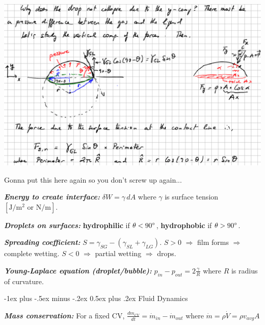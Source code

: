 \documentclass[10pt,landscape,letterpaper]{article}
\makeatletter
\renewcommand{\subsection}{\@startsection{subsection}{2}{0mm}%
                                {-1ex plus -.5ex minus -.2ex}%
                                {0.5ex plus .2ex}%
                                {\normalfont\normalsize\bfseries}}
\newenvironment{Figure}
    {\par\medskip\noindent\minipage{\linewidth}}
    {\endminipage\par\medskip}
\newcommand{\fsheetlabel}[1]{\textcolor{FSheetLabelColor}{\textbf{\textit{#1}}}}
\makeatother
\begin{document}
\begin{multicols*}{3}
\begin{minipage}{\columnwidth}
        \begin{Figure}
            \includegraphics[width=\textwidth]{droplet_question}
            \centering
        \end{Figure}
    
        Gonna put this here again so you don't screw up again...
        
        \fsheetlabel{Energy to create interface:} $\delta W = \gamma \,dA$ where $\gamma$ is surface tension $\left[ \si{\joule\per\square\metre} \text{ or } \si{\newton\per\metre} \right]$.
        
        \fsheetlabel{Droplets on surfaces:} \textbf{hydrophilic} if $\theta < 90\degree$, \textbf{hydrophobic} if $\theta > 90\degree$.
        
        \fsheetlabel{Spreading coefficient:} $S = \gamma_{SG} - \left(\gamma_{SL} + \gamma_{LG}\right)$. $S>0$ $\Rightarrow$ film forms $\Rightarrow$ complete wetting. $S<0$ $\Rightarrow$ partial wetting $\Rightarrow$ drops.
        
        \fsheetlabel{Young-Laplace equation (droplet/bubble):} $p_{in} - p_{out} = 2\frac{\gamma}{R}$ where $R$ is radius of curvature.
    \end{minipage}
    \vspace{2ex plus .5ex minus .5ex}
    
    \begin{minipage}{\columnwidth}\raggedright
        \subsection{Fluid Dynamics}
        
        \fsheetlabel{Mass conservation:} For a fixed CV, $ \frac{d{m}_{CV}}{dt} = \dot{m}_{in} - \dot{m}_{out} $ where $ \dot{m} = \rho \dot{V} = \rho v_{avg} A $
        

\end{minipage}
\end{multicols*}
\end{document}
